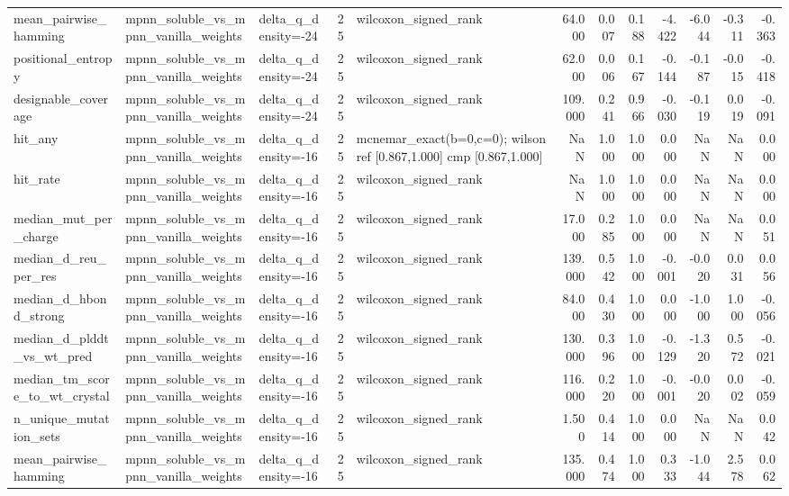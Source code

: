 \begin{table}
{\begin{tabular}{lllrlrrrrrrr}
mean\_pairwise\_hamming & mpnn\_soluble\_vs\_mpnn\_vanilla\_weights & delta\_q\_density=-24 & 25 & wilcoxon\_signed\_rank & 64.000 & 0.007 & 0.188 & -4.422 & -6.044 & -0.311 & -0.363 \\
positional\_entropy & mpnn\_soluble\_vs\_mpnn\_vanilla\_weights & delta\_q\_density=-24 & 25 & wilcoxon\_signed\_rank & 62.000 & 0.006 & 0.167 & -0.144 & -0.187 & -0.015 & -0.418 \\
designable\_coverage & mpnn\_soluble\_vs\_mpnn\_vanilla\_weights & delta\_q\_density=-24 & 25 & wilcoxon\_signed\_rank & 109.000 & 0.241 & 0.966 & -0.030 & -0.119 & 0.019 & -0.091 \\
hit\_any & mpnn\_soluble\_vs\_mpnn\_vanilla\_weights & delta\_q\_density=-16 & 25 & mcnemar\_exact(b=0,c=0); wilson ref [0.867,1.000] cmp [0.867,1.000] & NaN & 1.000 & 1.000 & 0.000 & NaN & NaN & 0.000 \\
hit\_rate & mpnn\_soluble\_vs\_mpnn\_vanilla\_weights & delta\_q\_density=-16 & 25 & wilcoxon\_signed\_rank & NaN & 1.000 & 1.000 & 0.000 & NaN & NaN & 0.000 \\
median\_mut\_per\_charge & mpnn\_soluble\_vs\_mpnn\_vanilla\_weights & delta\_q\_density=-16 & 25 & wilcoxon\_signed\_rank & 17.000 & 0.285 & 1.000 & 0.000 & NaN & NaN & 0.051 \\
median\_d\_reu\_per\_res & mpnn\_soluble\_vs\_mpnn\_vanilla\_weights & delta\_q\_density=-16 & 25 & wilcoxon\_signed\_rank & 139.000 & 0.542 & 1.000 & -0.001 & -0.020 & 0.031 & 0.056 \\
median\_d\_hbond\_strong & mpnn\_soluble\_vs\_mpnn\_vanilla\_weights & delta\_q\_density=-16 & 25 & wilcoxon\_signed\_rank & 84.000 & 0.430 & 1.000 & 0.000 & -1.000 & 1.000 & -0.056 \\
median\_d\_plddt\_vs\_wt\_pred & mpnn\_soluble\_vs\_mpnn\_vanilla\_weights & delta\_q\_density=-16 & 25 & wilcoxon\_signed\_rank & 130.000 & 0.396 & 1.000 & -0.129 & -1.320 & 0.572 & -0.021 \\
median\_tm\_score\_to\_wt\_crystal & mpnn\_soluble\_vs\_mpnn\_vanilla\_weights & delta\_q\_density=-16 & 25 & wilcoxon\_signed\_rank & 116.000 & 0.220 & 1.000 & -0.001 & -0.020 & 0.002 & -0.059 \\
n\_unique\_mutation\_sets & mpnn\_soluble\_vs\_mpnn\_vanilla\_weights & delta\_q\_density=-16 & 25 & wilcoxon\_signed\_rank & 1.500 & 0.414 & 1.000 & 0.000 & NaN & NaN & 0.042 \\
mean\_pairwise\_hamming & mpnn\_soluble\_vs\_mpnn\_vanilla\_weights & delta\_q\_density=-16 & 25 & wilcoxon\_signed\_rank & 135.000 & 0.474 & 1.000 & 0.333 & -1.044 & 2.578 & 0.062 \\

\end{tabular}}
\end{table}
